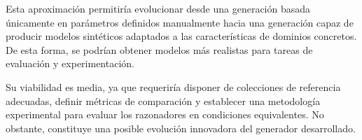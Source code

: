Esta aproximación permitiría evolucionar desde una generación basada únicamente
en parámetros definidos manualmente hacia una generación capaz de producir
modelos sintéticos adaptados a las características de dominios concretos. De
esta forma, se podrían obtener modelos más realistas para tareas de evaluación
y experimentación.

Su viabilidad es media, ya que requeriría disponer de colecciones de referencia
adecuadas, definir métricas de comparación y establecer una metodología
experimental para evaluar los razonadores en condiciones equivalentes.
No obstante, constituye una posible evolución innovadora del generador desarrollado.
